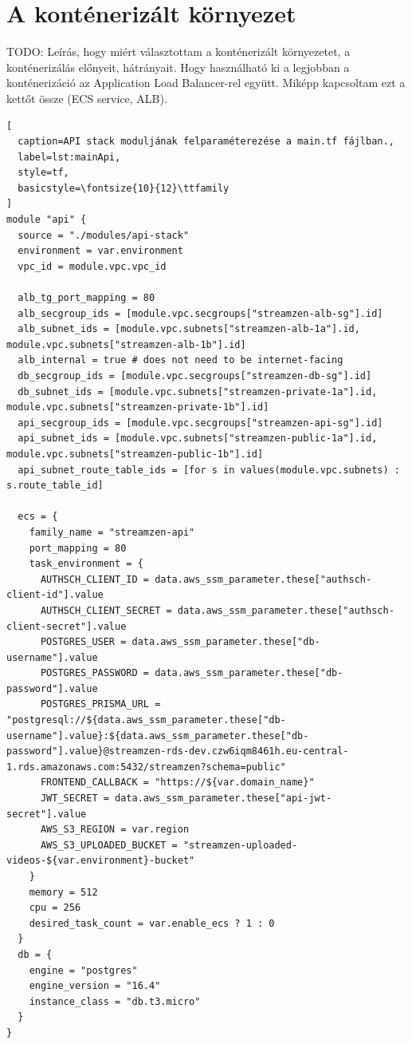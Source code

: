 \section{A konténerizált környezet}

TODO: Leírás, hogy miért választottam a konténerizált környezetet, a konténerizálás előnyeit, hátrányait. Hogy használható ki a legjobban a konténerizáció az Application Load Balancer-rel együtt. Miképp kapcsoltam ezt a kettőt össze (ECS service, ALB).

\begin{minipage}{0.92\textwidth}
\begin{lstlisting}[
  caption=API stack moduljának felparaméterezése a main.tf fájlban.,
  label=lst:mainApi,
  style=tf,
  basicstyle=\fontsize{10}{12}\ttfamily
]
module "api" {
  source = "./modules/api-stack"
  environment = var.environment
  vpc_id = module.vpc.vpc_id

  alb_tg_port_mapping = 80
  alb_secgroup_ids = [module.vpc.secgroups["streamzen-alb-sg"].id]
  alb_subnet_ids = [module.vpc.subnets["streamzen-alb-1a"].id, module.vpc.subnets["streamzen-alb-1b"].id]
  alb_internal = true # does not need to be internet-facing
  db_secgroup_ids = [module.vpc.secgroups["streamzen-db-sg"].id]
  db_subnet_ids = [module.vpc.subnets["streamzen-private-1a"].id, module.vpc.subnets["streamzen-private-1b"].id]
  api_secgroup_ids = [module.vpc.secgroups["streamzen-api-sg"].id]
  api_subnet_ids = [module.vpc.subnets["streamzen-public-1a"].id, module.vpc.subnets["streamzen-public-1b"].id]
  api_subnet_route_table_ids = [for s in values(module.vpc.subnets) : s.route_table_id]

  ecs = {
    family_name = "streamzen-api"
    port_mapping = 80
    task_environment = {
      AUTHSCH_CLIENT_ID = data.aws_ssm_parameter.these["authsch-client-id"].value
      AUTHSCH_CLIENT_SECRET = data.aws_ssm_parameter.these["authsch-client-secret"].value
      POSTGRES_USER = data.aws_ssm_parameter.these["db-username"].value
      POSTGRES_PASSWORD = data.aws_ssm_parameter.these["db-password"].value
      POSTGRES_PRISMA_URL = "postgresql://${data.aws_ssm_parameter.these["db-username"].value}:${data.aws_ssm_parameter.these["db-password"].value}@streamzen-rds-dev.czw6iqm8461h.eu-central-1.rds.amazonaws.com:5432/streamzen?schema=public"
      FRONTEND_CALLBACK = "https://${var.domain_name}"
      JWT_SECRET = data.aws_ssm_parameter.these["api-jwt-secret"].value
      AWS_S3_REGION = var.region
      AWS_S3_UPLOADED_BUCKET = "streamzen-uploaded-videos-${var.environment}-bucket"
    }
    memory = 512
    cpu = 256
    desired_task_count = var.enable_ecs ? 1 : 0
  }
  db = {
    engine = "postgres"
    engine_version = "16.4"
    instance_class = "db.t3.micro"
  }
}
\end{lstlisting}
\end{minipage}

